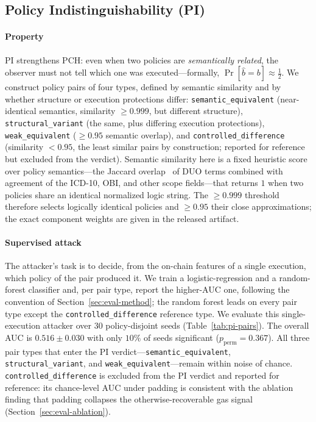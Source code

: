 \subsection{Policy Indistinguishability (PI)}
\label{sec:eval-pi}

\paragraph{Property} PI strengthens PCH: even when two policies are \emph{semantically related}, the observer must not tell which one was executed---formally, $\Pr[\hat b = b]\approx \tfrac12$.
We construct policy pairs of four types, defined by semantic similarity and by whether structure or execution protections differ: \texttt{semantic\_equivalent} (near-identical semantics, similarity $\ge 0.999$, but different structure), \texttt{structural\_variant} (the same, plus differing execution protections), \texttt{weak\_equivalent} ($\ge 0.95$ semantic overlap), and \texttt{controlled\_difference} (similarity $<0.95$, the least similar pairs by construction; reported for reference but excluded from the verdict).
Semantic similarity here is a fixed heuristic score over policy semantics---the Jaccard overlap~\cite{jaccard1912distribution} of DUO terms combined with agreement of the ICD-10, OBI, and other scope fields---that returns $1$ when two policies share an identical normalized logic string. The $\ge 0.999$ threshold therefore selects logically identical policies and $\ge 0.95$ their close approximations; the exact component weights are given in the released artifact.

\paragraph{Supervised attack} The attacker's task is to decide, from the on-chain features of a single execution, which policy of the pair produced it.
We train a logistic-regression and a random-forest classifier and, per pair type, report the higher-AUC one, following the convention of Section~\ref{sec:eval-method}; the random forest leads on every pair type except the \texttt{controlled\_difference} reference type.
We evaluate this single-execution attacker over 30 policy-disjoint seeds (Table~\ref{tab:pi-pairs}).
The overall AUC is $0.516\pm0.030$ with only $10\%$ of seeds significant ($p_{\mathrm{perm}}=0.367$).
All three pair types that enter the PI verdict---\texttt{semantic\_equivalent}, \texttt{structural\_variant}, and \texttt{weak\_equivalent}---remain within noise of chance.
\texttt{controlled\_difference} is excluded from the PI verdict and reported for reference: its chance-level AUC under padding is consistent with the ablation finding that padding collapses the otherwise-recoverable gas signal (Section~\ref{sec:eval-ablation}).
